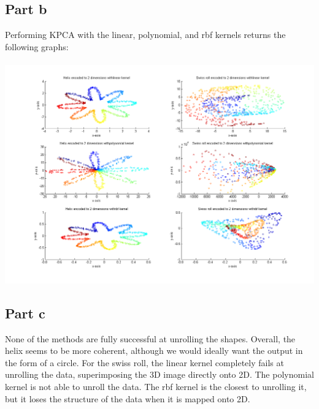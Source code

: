 \documentclass[paper=a4, fontsize=11pt]{scrartcl} %
\numberwithin{equation}{section} %
\numberwithin{figure}{section} %
\numberwithin{table}{section} %
\begin{document}
	\subsection{Part b}
	Performing KPCA with the linear, polynomial, and rbf kernels returns the following graphs:
	\\\\
	\hspace*{-4cm}\includegraphics[scale=0.7]{3kernels}
	\subsection{Part c}
	None of the methods are fully successful at unrolling the shapes. Overall, the helix seems to be more coherent, although we would ideally want the output in the form of a circle. For the swiss roll, the linear kernel completely fails at unrolling the data, superimposing the 3D image directly onto 2D. The polynomial kernel is not able to unroll the data. The rbf kernel is the closest to unrolling it, but it loses the structure of the data when it is mapped onto 2D.
\end{document}
